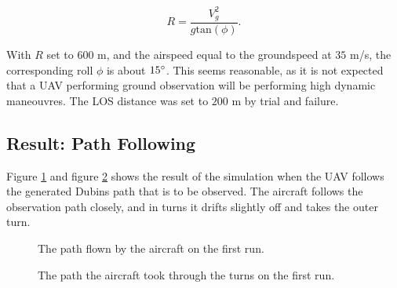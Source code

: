 \begin{equation}
	R = \frac{V_g^2}{g\text{tan}(\phi)}.
\end{equation}

With $R$ set to $600$ m, and the airspeed equal to the groundspeed at $35$ m/s, the corresponding roll $\phi$ is about $15\degree$. This seems reasonable, as it is not expected that a UAV performing ground observation will be performing high dynamic maneouvres. The LOS distance was set to $200$ m by trial and failure.


\subsection{Result: Path Following}

Figure \ref{fig:first_run_path} and figure \ref{fig:first_run_turns} shows the result of the simulation when the UAV follows the generated Dubins path that is to be observed. The aircraft follows the observation path closely, and in turns it drifts slightly off and takes the outer turn. 

\begin{figure}[!ht]
    \centering
    \caption{The path flown by the aircraft on the first run.}
	\label{fig:first_run_path}
\end{figure}

\begin{figure}[!ht]
    \centering
    \caption{The path the aircraft took through the turns on the first run.}
	\label{fig:first_run_turns}
\end{figure}

